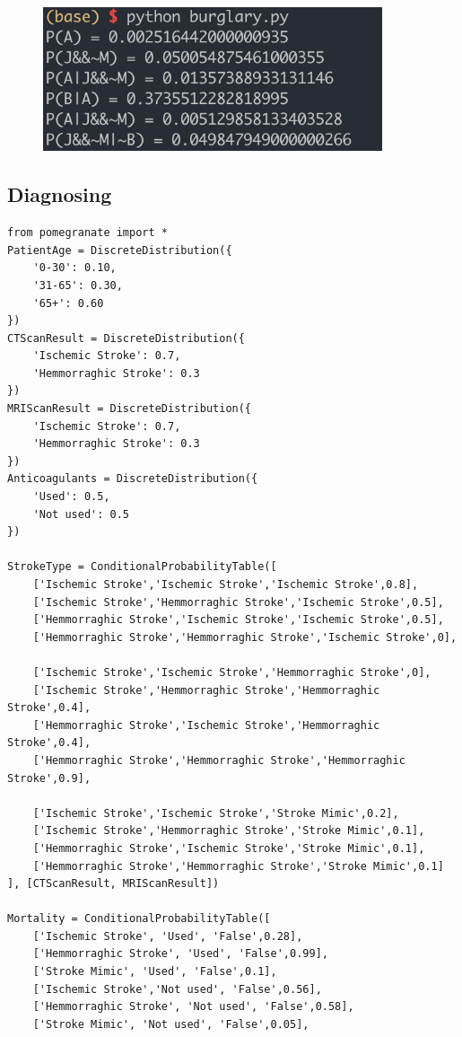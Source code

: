\documentclass[a4paper, 11pt]{article}
\begin{document}
\begin{figure}[ht]
\centering
\includegraphics[width=10cm]{Pic/my_burglary.png}
\end{figure}


\subsection{Diagnosing}
\begin{lstlisting}[title=diagnosing.py]
from pomegranate import *
PatientAge = DiscreteDistribution({
    '0-30': 0.10,
    '31-65': 0.30,
    '65+': 0.60
})
CTScanResult = DiscreteDistribution({
    'Ischemic Stroke': 0.7,
    'Hemmorraghic Stroke': 0.3
})
MRIScanResult = DiscreteDistribution({
    'Ischemic Stroke': 0.7,
    'Hemmorraghic Stroke': 0.3
})
Anticoagulants = DiscreteDistribution({
    'Used': 0.5,
    'Not used': 0.5
})

StrokeType = ConditionalProbabilityTable([
    ['Ischemic Stroke','Ischemic Stroke','Ischemic Stroke',0.8],
    ['Ischemic Stroke','Hemmorraghic Stroke','Ischemic Stroke',0.5],  
    ['Hemmorraghic Stroke','Ischemic Stroke','Ischemic Stroke',0.5],
    ['Hemmorraghic Stroke','Hemmorraghic Stroke','Ischemic Stroke',0], 

    ['Ischemic Stroke','Ischemic Stroke','Hemmorraghic Stroke',0],
    ['Ischemic Stroke','Hemmorraghic Stroke','Hemmorraghic Stroke',0.4], 
    ['Hemmorraghic Stroke','Ischemic Stroke','Hemmorraghic Stroke',0.4],
    ['Hemmorraghic Stroke','Hemmorraghic Stroke','Hemmorraghic Stroke',0.9],

    ['Ischemic Stroke','Ischemic Stroke','Stroke Mimic',0.2],
    ['Ischemic Stroke','Hemmorraghic Stroke','Stroke Mimic',0.1],    
    ['Hemmorraghic Stroke','Ischemic Stroke','Stroke Mimic',0.1],
    ['Hemmorraghic Stroke','Hemmorraghic Stroke','Stroke Mimic',0.1]
], [CTScanResult, MRIScanResult])

Mortality = ConditionalProbabilityTable([
    ['Ischemic Stroke', 'Used', 'False',0.28],
    ['Hemmorraghic Stroke', 'Used', 'False',0.99],
    ['Stroke Mimic', 'Used', 'False',0.1],
    ['Ischemic Stroke','Not used', 'False',0.56],
    ['Hemmorraghic Stroke', 'Not used', 'False',0.58],
    ['Stroke Mimic', 'Not used', 'False',0.05],


\end{lstlisting}
\end{document}
